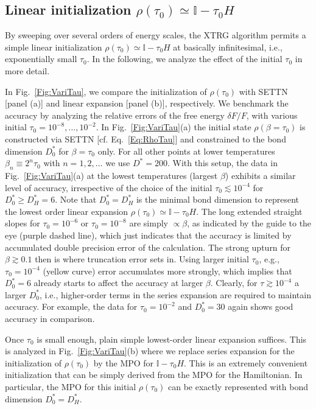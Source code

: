 \documentclass[aps,prx,twocolumn,showpacs,psfig,superscriptaddress,longbibliography]{revtex4-1}
\newcommand{\Eq}[1]{Eq.~\eqref{#1}}
\newcommand{\Fig}[1]{Fig.~\ref{#1}}
\def\Dstar{D^\ast}
\def\taui{\tau_0}
\def\Dstari{\Dstar_0}
\begin{document}
\subsection{Linear initialization $\rho(\taui) \simeq \mathbb{I}-\taui H$}

By sweeping over several orders of energy scales, the XTRG algorithm
permits a simple linear initialization $\rho(\taui)\simeq
\mathbb{I}-\taui H$ at basically infinitesimal, i.e., exponentially
small $\taui$. In the following, we analyze the effect of the
initial $\taui$ in more detail.

In \Fig{Fig:VariTau}, we compare the initialization of $\rho(\taui)$
with SETTN [panel (a)] and linear expansion [panel (b)],
respectively.  We benchmark the accuracy by analyzing the relative
errors of the free energy $\delta F/F$, with various initial
$\taui=10^{-8}, \ldots,10^{-2}$.  In \Fig{Fig:VariTau}(a) the
initial state $\rho(\beta=\taui)$ is constructed via SETTN [cf.
\Eq{Eq:RhoTau}] and constrained to the bond dimension $\Dstari$ for
$\beta=\taui$ only.  For all other points at lower temperatures
$\beta_n \equiv 2^n \taui$ with $n=1,2,\ldots$ we use $\Dstar=200$.
With this setup, the data in \Fig{Fig:VariTau}(a) at the lowest
temperatures (largest $\beta$)  {exhibits} a similar level of accuracy,
irrespective of the choice of the initial $\taui \lesssim 10^{-4}$
for $\Dstari \ge \Dstar_H = 6$.  Note that $\Dstari = \Dstar_H$ is
the minimal bond dimension to represent the lowest order linear
expansion $\rho(\taui)\simeq \mathbb{I}-\taui H$.  The long
extended straight slopes for $\taui =10^{-6}$ or $\taui=10^{-8}$
are simply $\propto \beta$, as indicated by the guide to the eye
(purple dashed line), which just indicates that the accuracy is
limited by accumulated double precision error of the calculation.
The strong upturn for $\beta \gtrsim 0.1$ then is where truncation
error sets in. Using larger initial $\taui$, e.g., $\taui=10^{-4}$
(yellow curve) error accumulates more strongly, which implies that
$\Dstari=6$ already starts to affect the accuracy at larger
$\beta$. Clearly, for $\tau \gtrsim 10^{-4}$ a larger $\Dstari$,
i.e., higher-order terms in the series expansion are required to
maintain accuracy.  For example, the data for $\taui=10^{-2}$ and
$\Dstari=30$ again shows good accuracy in comparison.

Once $\taui$ is small enough, plain simple lowest-order linear
expansion suffices.  This is analyzed in \Fig{Fig:VariTau}(b) where
we replace series expansion for the initialization of $\rho(\taui)$
by the MPO for $\mathbb{I}-\taui H$.  This is an extremely
convenient initialization that can be simply derived from the MPO
for the Hamiltonian.  In particular, the MPO for this initial
 $\rho(\taui)$ can be exactly represented with bond dimension
 $\Dstari=\Dstar_H$.
\end{document}
